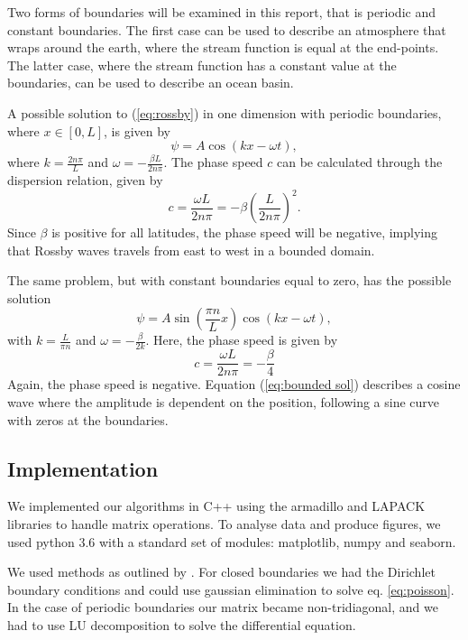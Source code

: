 Two forms of boundaries will be examined in this report, that is periodic and constant boundaries. The first case can be used to describe an atmosphere that wraps around the earth, where the stream function is equal at the end-points. The latter case, where the stream function has a constant value at the boundaries, can be used to describe an ocean basin.  

A possible solution to (\ref{eq:rossby}) in one dimension with periodic boundaries, where $x \in \left[0,L \right] $, is given by 
\begin{equation}\label{eq:periodic sol}
	\psi = A\cos{\left(kx-\omega t\right)},
\end{equation}
where $k=\frac{2n\pi}{L}$ and $\omega = - \frac{\beta L}{2n\pi}$. The phase speed $c$ can be calculated through the dispersion relation, given by
\begin{equation}
	c = \frac{\omega L}{2n\pi}=-\beta \left(\frac{L}{2n\pi}\right)^2.
\end{equation}
Since $\beta$ is positive for all latitudes, the phase speed will be negative, implying that Rossby waves travels from east to west in a bounded domain. 

The same problem, but with constant boundaries equal to zero, has the possible solution 
\begin{equation}\label{eq:bounded sol}
	\psi = A\sin\left(\frac{\pi n}{L}x\right)\cos\left(kx-\omega t\right),
\end{equation}
with $k = \frac{L}{\pi n}$ and $\omega = - \frac{\beta}{2k}$. Here, the phase speed is given by 
\begin{equation}
	c = \frac{\omega L}{2n\pi} = - \frac{\beta}{4}
\end{equation}
Again, the phase speed is negative. Equation (\ref{eq:bounded sol}) describes a cosine wave where the amplitude is dependent on the position, following a sine curve with zeros at the boundaries.


\subsection{Implementation}
\label{sec:implement}
We implemented our algorithms in C++ using the armadillo and LAPACK libraries to handle matrix operations. To analyse data and produce figures, we used python 3.6 with a standard set of modules: matplotlib, numpy and seaborn.

We used methods as outlined by \citet{sjurkal}. For closed boundaries we had the Dirichlet boundary conditions and could use gaussian elimination to solve eq. \ref{eq:poisson}. In the case of periodic boundaries our matrix became non-tridiagonal, and we had to use LU decomposition to solve the differential equation.
